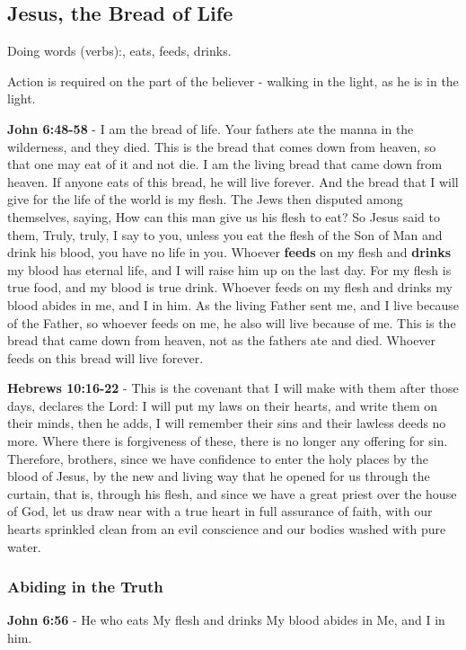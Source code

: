 \documentclass[11pt]{article}
\begin{document}
\subsection{Jesus, the Bread of Life}
\label{sec:orgf6387f0}
Doing words (verbs):, eats, feeds, drinks.

Action is required on the part of the believer - walking in the light, as he is in the light.

\textbf{John 6:48-58} - I am the bread of life. Your fathers ate the manna in the wilderness, and they died. This is the bread that comes down from heaven, so that one may eat of it and not die. I am the living bread that came down from heaven. If anyone eats of this bread, he will live forever. And the bread that I will give for the life of the world is my flesh. The Jews then disputed among themselves, saying, How can this man give us his flesh to eat? So Jesus said to them, Truly, truly, I say to you, unless you eat the flesh of the Son of Man and drink his blood, you have no life in you. Whoever \textbf{feeds} on my flesh and \textbf{drinks} my blood has eternal life, and I will raise him up on the last day. For my flesh is true food, and my blood is true drink. Whoever feeds on my flesh and drinks my blood abides in me, and I in him. As the living Father sent me, and I live because of the Father, so whoever feeds on me, he also will live because of me. This is the bread that came down from heaven, not as the fathers ate and died. Whoever feeds on this bread will live forever.

\textbf{Hebrews 10:16-22} - This is the covenant that I will make with them after those days, declares the Lord: I will put my laws on their hearts, and write them on their minds, then he adds, I will remember their sins and their lawless deeds no more.  Where there is forgiveness of these, there is no longer any offering for sin.  Therefore, brothers, since we have confidence to enter the holy places by the blood of Jesus, by the new and living way that he opened for us through the curtain, that is, through his flesh, and since we have a great priest over the house of God, let us draw near with a true heart in full assurance of faith, with our hearts sprinkled clean from an evil conscience and our bodies washed with pure water.

\subsubsection{Abiding in the Truth}
\label{sec:orgfea579e}
\textbf{John 6:56} - He who eats My flesh and drinks My blood abides in Me, and I in him.
\end{document}
